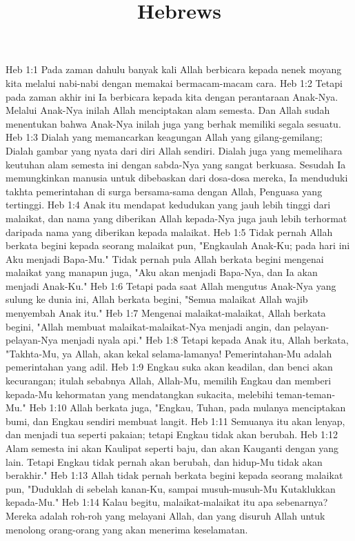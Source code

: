 

\title{Hebrews}

Heb 1:1  Pada zaman dahulu banyak kali Allah berbicara kepada nenek moyang kita melalui nabi-nabi dengan memakai bermacam-macam cara.
Heb 1:2  Tetapi pada zaman akhir ini Ia berbicara kepada kita dengan perantaraan Anak-Nya. Melalui Anak-Nya inilah Allah menciptakan alam semesta. Dan Allah sudah menentukan bahwa Anak-Nya inilah juga yang berhak memiliki segala sesuatu.
Heb 1:3  Dialah yang memancarkan keagungan Allah yang gilang-gemilang; Dialah gambar yang nyata dari diri Allah sendiri. Dialah juga yang memelihara keutuhan alam semesta ini dengan sabda-Nya yang sangat berkuasa. Sesudah Ia memungkinkan manusia untuk dibebaskan dari dosa-dosa mereka, Ia menduduki takhta pemerintahan di surga bersama-sama dengan Allah, Penguasa yang tertinggi.
Heb 1:4  Anak itu mendapat kedudukan yang jauh lebih tinggi dari malaikat, dan nama yang diberikan Allah kepada-Nya juga jauh lebih terhormat daripada nama yang diberikan kepada malaikat.
Heb 1:5  Tidak pernah Allah berkata begini kepada seorang malaikat pun, "Engkaulah Anak-Ku; pada hari ini Aku menjadi Bapa-Mu." Tidak pernah pula Allah berkata begini mengenai malaikat yang manapun juga, "Aku akan menjadi Bapa-Nya, dan Ia akan menjadi Anak-Ku."
Heb 1:6  Tetapi pada saat Allah mengutus Anak-Nya yang sulung ke dunia ini, Allah berkata begini, "Semua malaikat Allah wajib menyembah Anak itu."
Heb 1:7  Mengenai malaikat-malaikat, Allah berkata begini, "Allah membuat malaikat-malaikat-Nya menjadi angin, dan pelayan-pelayan-Nya menjadi nyala api."
Heb 1:8  Tetapi kepada Anak itu, Allah berkata, "Takhta-Mu, ya Allah, akan kekal selama-lamanya! Pemerintahan-Mu adalah pemerintahan yang adil.
Heb 1:9  Engkau suka akan keadilan, dan benci akan kecurangan; itulah sebabnya Allah, Allah-Mu, memilih Engkau dan memberi kepada-Mu kehormatan yang mendatangkan sukacita, melebihi teman-teman-Mu."
Heb 1:10  Allah berkata juga, "Engkau, Tuhan, pada mulanya menciptakan bumi, dan Engkau sendiri membuat langit.
Heb 1:11  Semuanya itu akan lenyap, dan menjadi tua seperti pakaian; tetapi Engkau tidak akan berubah.
Heb 1:12  Alam semesta ini akan Kaulipat seperti baju, dan akan Kauganti dengan yang lain. Tetapi Engkau tidak pernah akan berubah, dan hidup-Mu tidak akan berakhir."
Heb 1:13  Allah tidak pernah berkata begini kepada seorang malaikat pun, "Duduklah di sebelah kanan-Ku, sampai musuh-musuh-Mu Kutaklukkan kepada-Mu."
Heb 1:14  Kalau begitu, malaikat-malaikat itu apa sebenarnya? Mereka adalah roh-roh yang melayani Allah, dan yang disuruh Allah untuk menolong orang-orang yang akan menerima keselamatan.
